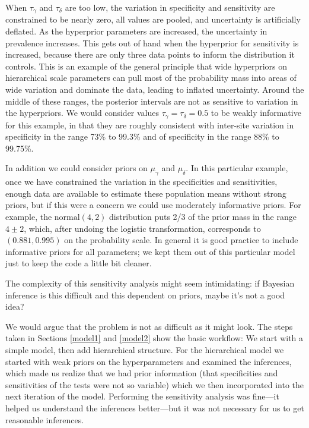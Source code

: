 \documentclass[11pt]{article}
\begin{document}
When $\tau_{\gamma}$ and $\tau_{\delta}$ are too low, the variation in specificity and sensitivity are constrained to be nearly zero, all values are pooled, and
uncertainty is artificially deflated. As the hyperprior parameters are increased,
the uncertainty in prevalence increases. This gets out of hand when
the hyperprior for sensitivity is increased, because there are only
three data points to inform the distribution it controls. This is an example of the general principle that
wide hyperpriors on hierarchical scale parameters can pull most of the probability mass into areas of wide
variation and dominate the data, leading to inflated uncertainty.
Around the middle of these ranges, the posterior intervals
are not as sensitive to variation in the hyperpriors. We would consider values $\tau_{\gamma}=\tau_{\delta}=0.5$ to be weakly informative for this example, in that they are roughly consistent with inter-site
variation in specificity in the range 73\% to 99.3\% and of specificity
in the range 88\% to 99.75\%.

In addition we could consider priors on $\mu_{\gamma}$ and $\mu_{\delta}$.  In this particular example, once we have constrained the variation in the specificities and sensitivities,  enough data are available to estimate these population means without strong priors, but if this were a concern we could use moderately informative priors.  For example, the $\mbox{normal}(4,2)$ distribution puts 2/3 of the prior mass in the range $4\pm 2$, which, after undoing the logistic transformation, corresponds to $(0.881, 0.995)$ on the probability scale.  In general it is good practice to include informative priors for all parameters; we kept them out of this particular model just to keep the code a little bit cleaner.

The complexity of this sensitivity analysis might seem intimidating:  if Bayesian inference is this difficult and this dependent on priors, maybe it's not a good idea?

We would argue that the problem is not as difficult as it might look.  The steps taken in Sections \ref{model1} and \ref{model2} show the basic workflow:  We start with a simple model, then add hierarchical structure.  For the hierarchical model we started with weak priors on the hyperparameters and examined the inferences, which made us realize that we had prior information (that specificities and sensitivities of the tests were not so variable) which we then incorporated into the next iteration of the model.  Performing the sensitivity analysis was fine---it helped us understand the inferences better---but it was not necessary for us to get reasonable inferences.
\end{document}
